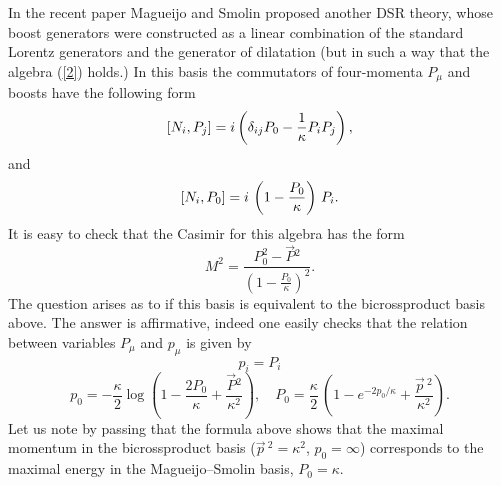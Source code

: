 \documentclass[a4paper,a4paper]{article}
\begin{document}
In the recent paper \cite{JoaoLee} Magueijo and Smolin proposed
another DSR theory, whose boost  generators were constructed as a
linear combination of the standard Lorentz generators and the
generator of dilatation (but in such a way that the algebra
(\ref{2}) holds.) In this basis the commutators of four-momenta
$P_\mu$ and boosts have the following form
\begin{equation}\label{7}
   \left[N_{i}, P_{j}\right] =  i\left( \delta_{ij}P_0 -
  {1\over \kappa} P_{i}P_{j} \right),
\end{equation}
and
\begin{equation}\label{8}
  \left[N_{i},P_{0}\right] = i\, \left( 1 - {P_0\over \kappa}\right)\,P_{i}.
\end{equation}
It is easy to check that the Casimir for this algebra has the form
\begin{equation}\label{9}
 M^2 = \frac{P_{0}^2 - \vec{P}{}^2}{\left(1- \frac{P_0}\kappa\right)^2}.
\end{equation}
The question arises as to if this basis is equivalent to the
bicrossproduct basis above. The answer is  affirmative, indeed one
easily checks that the relation between variables $P_\mu$ and
$p_\mu$ is given by
\begin{equation}\label{10}
p_{i} = P_{i}
\end{equation}
\begin{equation}\label{11}
p_0 = - \frac\kappa2\log\left(1 - \frac{2P_0}{\kappa} + \frac{\vec{P}{}^2}{\kappa^2}\right),
\quad  P_0 = \frac\kappa2\,\left(1 -  e^{-2p_0/\kappa} + \frac{\vec{p}\,{}^2}{\kappa^2}\right).
\end{equation}
Let us note by passing that  the  formula above shows that the
maximal momentum in the bicrossproduct basis  ($\vec{p}\,{}^2 =
\kappa^2$, $p_0=\infty$) corresponds to the maximal energy in the
Magueijo--Smolin basis, $P_0 =\kappa$.
\end{document}
